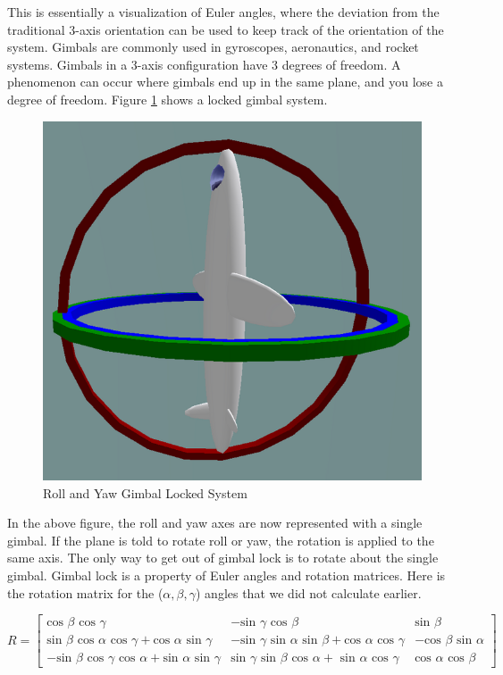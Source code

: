  This is essentially a visualization of Euler angles, where the deviation from the traditional 3-axis orientation can be used to keep track of the orientation of the system.
 Gimbals are commonly used in gyroscopes, aeronautics, and rocket systems.
 Gimbals in a 3-axis configuration have 3 degrees of freedom.
 A phenomenon can occur where gimbals end up in the same plane, and you lose a degree of freedom.
 Figure \ref{fig:gimlock} shows a locked gimbal system.

 \begin{figure}[H]
 \centering
 \includegraphics[width = .75\textwidth]{Figures/gimbal_lock.png}
 \caption{Roll and Yaw Gimbal Locked System}
 \label{fig:gimlock}
 \end{figure}

 In the above figure, the roll and yaw axes are now represented with a single gimbal.
 If the plane is told to rotate roll or yaw, the rotation is applied to the same axis.
 The only way to get out of gimbal lock is to rotate about the single gimbal.
 Gimbal lock is a property of Euler angles and rotation matrices.
 Here is the rotation matrix for the ($\alpha, \beta, \gamma$) angles that we did not calculate earlier.

 $$
 R =
 \begin{bmatrix}
 \text{cos }\beta \text{ cos }\gamma 																& -\text{sin }\gamma \text{ cos }\beta & \text{sin }\beta \\
 \text{sin }\beta \text{ cos }\alpha  \text{ cos }\gamma + \text{cos }\alpha \text{ sin }\gamma 	& - \text{sin }\gamma \text{ sin }\alpha \text{ sin }\beta + \text{cos }\alpha \text{ cos }\gamma & -\text{cos }\beta \text{ sin }\alpha \\
 -\text{sin }\beta \text{ cos }\gamma \text{ cos }\alpha + \text{sin }\alpha \text{ sin }\gamma 		& \text{sin }\gamma \text{ sin }\beta \text{ cos } \alpha + \text{ sin }\alpha \text{ cos } \gamma & \text{cos } \alpha \text{ cos } \beta
 \end{bmatrix}
 $$

